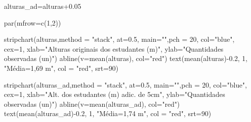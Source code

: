 \documentclass[
]{book}
\newenvironment{Shaded}{\begin{snugshade}}{\end{snugshade}}
\newcommand{\AttributeTok}[1]{\textcolor[rgb]{0.77,0.63,0.00}{#1}}
\newcommand{\DecValTok}[1]{\textcolor[rgb]{0.00,0.00,0.81}{#1}}
\newcommand{\FloatTok}[1]{\textcolor[rgb]{0.00,0.00,0.81}{#1}}
\newcommand{\FunctionTok}[1]{\textcolor[rgb]{0.00,0.00,0.00}{#1}}
\newcommand{\NormalTok}[1]{#1}
\newcommand{\OtherTok}[1]{\textcolor[rgb]{0.56,0.35,0.01}{#1}}
\newcommand{\SpecialCharTok}[1]{\textcolor[rgb]{0.00,0.00,0.00}{#1}}
\newcommand{\StringTok}[1]{\textcolor[rgb]{0.31,0.60,0.02}{#1}}
\begin{document}
\begin{Shaded}
\begin{Highlighting}[]
\NormalTok{alturas\_ad}\OtherTok{=}\NormalTok{alturas}\FloatTok{+0.05}

\FunctionTok{par}\NormalTok{(}\AttributeTok{mfrow=}\FunctionTok{c}\NormalTok{(}\DecValTok{1}\NormalTok{,}\DecValTok{2}\NormalTok{))}

\FunctionTok{stripchart}\NormalTok{(alturas,}\AttributeTok{method =} \StringTok{"stack"}\NormalTok{,  }\AttributeTok{at=}\FloatTok{0.5}\NormalTok{, }
\AttributeTok{main=}\StringTok{""}\NormalTok{,}\AttributeTok{pch =} \DecValTok{20}\NormalTok{,}
\AttributeTok{col=}\StringTok{"blue"}\NormalTok{, }\AttributeTok{cex=}\DecValTok{1}\NormalTok{, }\AttributeTok{xlab=}\StringTok{"Alturas originais dos estudantes (m)"}\NormalTok{, }
\AttributeTok{ylab=}\StringTok{"Quantidades observadas (un)"}\NormalTok{)}
\FunctionTok{abline}\NormalTok{(}\AttributeTok{v=}\FunctionTok{mean}\NormalTok{(alturas), }\AttributeTok{col=}\StringTok{"red"}\NormalTok{) }
\FunctionTok{text}\NormalTok{(}\FunctionTok{mean}\NormalTok{(alturas)}\SpecialCharTok{{-}}\FloatTok{0.2}\NormalTok{, }\DecValTok{1}\NormalTok{, }\StringTok{"Média=1,69 m"}\NormalTok{, }\AttributeTok{col =} \StringTok{"red"}\NormalTok{, }\AttributeTok{srt=}\DecValTok{90}\NormalTok{) }

\FunctionTok{stripchart}\NormalTok{(alturas\_ad,}\AttributeTok{method =} \StringTok{"stack"}\NormalTok{,  }\AttributeTok{at=}\FloatTok{0.5}\NormalTok{, }
\AttributeTok{main=}\StringTok{""}\NormalTok{,}\AttributeTok{pch =} \DecValTok{20}\NormalTok{,}
\AttributeTok{col=}\StringTok{"blue"}\NormalTok{, }\AttributeTok{cex=}\DecValTok{1}\NormalTok{, }\AttributeTok{xlab=}\StringTok{"Alt. dos estudantes (m) adic. de 5cm"}\NormalTok{, }
\AttributeTok{ylab=}\StringTok{"Quantidades observadas (un)"}\NormalTok{)}
\FunctionTok{abline}\NormalTok{(}\AttributeTok{v=}\FunctionTok{mean}\NormalTok{(alturas\_ad), }\AttributeTok{col=}\StringTok{"red"}\NormalTok{) }
\FunctionTok{text}\NormalTok{(}\FunctionTok{mean}\NormalTok{(alturas\_ad)}\SpecialCharTok{{-}}\FloatTok{0.2}\NormalTok{, }\DecValTok{1}\NormalTok{, }\StringTok{"Média=1,74 m"}\NormalTok{, }\AttributeTok{col =} \StringTok{"red"}\NormalTok{, }\AttributeTok{srt=}\DecValTok{90}\NormalTok{) }
\end{Highlighting}
\end{Shaded}
\end{document}
